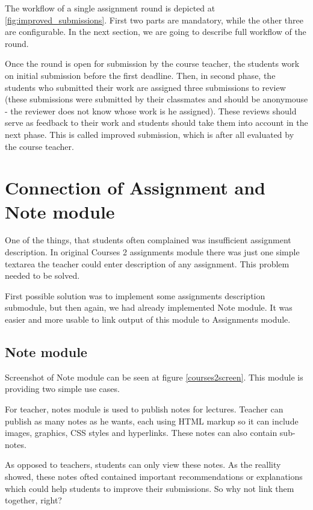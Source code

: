 The workflow of a single assignment round is depicted at \ref{fig:improved_submissions}. First two parts are mandatory, while the other three are configurable. In the next section, we are going to describe full workflow of the round.


Once the round is open for submission by the course teacher, the students work on initial submission before the first deadline. Then, in second phase, the students who submitted their work are assigned three submissions to review (these submissions were submitted by their classmates and should be anonymouse - the reviewer does not know whose work is he assigned). These reviews should serve as feedback to their work and students should take them into account in the next phase. This is called improved submission, which is after all evaluated by the course teacher.


\section{Connection of Assignment and Note module}

One of the things, that students often complained was insufficient assignment description. In original Courses 2 assignments module there was just one simple textarea the teacher could enter description of any assignment. This problem needed to be solved.

First possible solution was to implement some assignments description submodule, but then again, we had already implemented Note module. It was easier and more usable to link output of this module to Assignments module.

\subsection{Note module}
Screenshot of Note module can be seen at figure \ref{courses2screen}. This module is providing two simple use cases.

For teacher, notes module is used to publish notes for lectures. Teacher can publish as many notes as he wants, each using HTML markup so it can include images, graphics, CSS styles and hyperlinks. These notes can also contain sub-notes.

As opposed to teachers, students can only view these notes. As the reallity showed, these notes ofted contained important recommendations or explanations which could help students to improve their submissions. So why not link them together, right?

